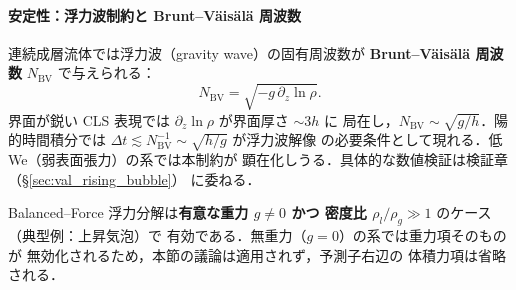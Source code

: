\paragraph{安定性：浮力波制約と Brunt--Väisälä 周波数}
連続成層流体では浮力波（gravity wave）の固有周波数が
\textbf{Brunt--Väisälä 周波数} $N_{\mathrm{BV}}$ で与えられる：
\begin{equation}
  N_{\mathrm{BV}} = \sqrt{-g\,\partial_z \ln\rho}.
  \label{eq:brunt_vaisala}
\end{equation}
界面が鋭い CLS 表現では $\partial_z\ln\rho$ が界面厚さ $\sim 3h$ に
局在し，$N_{\mathrm{BV}} \sim \sqrt{g/h}$．陽的時間積分では
$\Delta t \lesssim N_{\mathrm{BV}}^{-1} \sim \sqrt{h/g}$ が浮力波解像
の必要条件として現れる．低 We（弱表面張力）の系では本制約が
顕在化しうる．具体的な数値検証は検証章（\S\ref{sec:val_rising_bubble}）
に委ねる．

\begin{tcolorbox}[colback=yellow!5,colframe=orange!60!black,title={\textbf{適用範囲：浮力分解の有効ケース}}]
\label{warn:balanced_buoy_scope}
Balanced--Force 浮力分解は\textbf{有意な重力 $g \neq 0$ かつ
密度比 $\rho_l/\rho_g \gg 1$} のケース（典型例：上昇気泡）で
有効である．無重力（$g=0$）の系では重力項そのものが
無効化されるため，本節の議論は適用されず，予測子右辺の
体積力項は省略される．
\end{tcolorbox}

